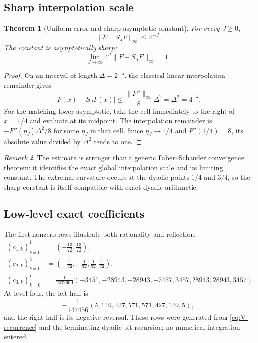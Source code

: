 \documentclass[11pt,oneside]{article}
\newtheorem{theorem}{Theorem}[section]
\theoremstyle{definition}
\theoremstyle{remark}
\newtheorem{remark}[theorem]{Remark}
\newcommand{\1}{\mathbf 1}
\begin{document}
\subsection{Sharp interpolation scale}

\begin{theorem}[Uniform error and sharp asymptotic constant]
\label{thm:faber-error}
For every $J\ge0$,
\begin{equation}
 \|F-S_JF\|_\infty\le4^{-J}.                             \label{eq:faber-error-bound}
\end{equation}
The constant is asymptotically sharp:
\begin{equation}
 \boxed{\displaystyle
 \lim_{J\to\infty}4^J\|F-S_JF\|_\infty=1.}              \label{eq:faber-error-limit}
\end{equation}
\end{theorem}

\begin{proof}
On an interval of length $\Delta=2^{-J}$, the classical linear-interpolation
remainder gives
\[
 |F(x)-S_JF(x)|\le\frac{\|F''\|_\infty}{8}\Delta^2
 =\Delta^2=4^{-J}.
\]
For the matching lower asymptotic, take the cell immediately to the right of
$x=1/4$ and evaluate at its midpoint.  The interpolation remainder is
$-F''(\eta_J)\Delta^2/8$ for some $\eta_J$ in that cell.  Since
$\eta_J\to1/4$ and $F''(1/4)=8$, its absolute value divided by $\Delta^2$
tends to one.
\end{proof}

\begin{remark}
The estimate is stronger than a generic Faber--Schauder convergence theorem:
it identifies the exact global interpolation scale and its limiting constant.
The extremal curvature occurs at the dyadic points $1/4$ and $3/4$, so the
sharp constant is itself compatible with exact dyadic arithmetic.
\end{remark}

\subsection{Low-level exact coefficients}

The first nonzero rows illustrate both rationality and reflection:
\begin{align}
 (c_{1,k})_{k=0}^{1}
   &=\left(-\frac{13}{72},\frac{13}{72}\right),          \label{eq:faber-row1}\\
 (c_{2,k})_{k=0}^{3}
   &=\left(-\frac1{32},-\frac1{32},\frac1{32},\frac1{32}\right), \label{eq:faber-row2}\\
 (c_{3,k})_{k=0}^{7}
   &=\frac1{2073600}
     (-3457,-28943,-28943,-3457,3457,28943,28943,3457).  \label{eq:faber-row3}
\end{align}
At level four, the left half is
\begin{equation}
 -\frac1{147456}(5,149,427,571,571,427,149,5),            \label{eq:faber-row4}
\end{equation}
and the right half is its negative reversal.  These rows were generated from
\eqref{eq:V-recurrence} and the terminating dyadic bit recursion; no numerical
integration entered.
\end{document}
